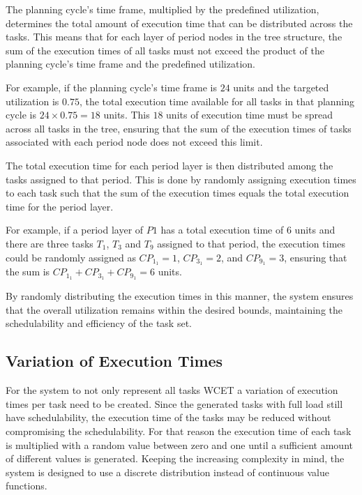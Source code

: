 The planning cycle's time frame, multiplied by the predefined utilization, determines the total amount of execution time that can be distributed across the tasks.
This means that for each layer of period nodes in the tree structure, the sum of the execution times of all tasks must not exceed the product of the planning cycle's time frame and the predefined utilization.

For example, if the planning cycle's time frame is $24$ units and the targeted utilization is $0.75$, the total execution time available for all tasks in that planning cycle is \(24 \times 0.75 = 18\) units.
This $18$ units of execution time must be spread across all tasks in the tree, ensuring that the sum of the execution times of tasks associated with each period node does not exceed this limit.

The total execution time for each period layer is then distributed among the tasks assigned to that period. This is done by randomly assigning execution times to each task such that the sum of the execution times equals the total execution time for the period layer.

For example, if a period layer of $P1$ has a total execution time of $6$ units and there are three tasks $T_1$, $T_3$ and $T_9$ assigned to that period, the execution times could be randomly assigned as $CP_{1_1} = 1$, $CP_{3_1} = 2$, and $CP_{9_1} = 3$, ensuring that the sum is \( CP_{1_1} + CP_{3_1} + CP_{9_1} = 6 \) units.

By randomly distributing the execution times in this manner, the system ensures that the overall utilization remains within the desired bounds, maintaining the schedulability and efficiency of the task set.


\subsection{Variation of Execution Times}\label{sec:concept_lower_execution_times}
For the system to not only represent all tasks \ac{WCET} a variation of execution times per task need to be created.
Since the generated tasks with full load still have schedulability, the execution time of the tasks may be reduced without compromising the schedulability.
For that reason the execution time of each task is multiplied with a random value between zero and one until a sufficient amount of different values is generated.
Keeping the increasing complexity in mind, the system is designed to use a discrete distribution instead of continuous value functions. 

